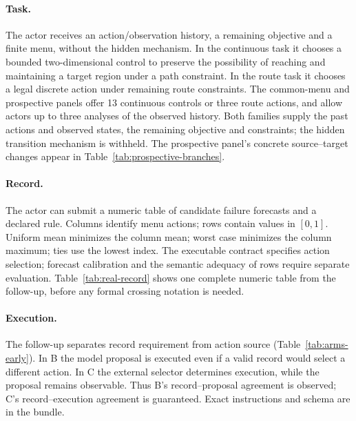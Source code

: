 \paragraph{Task.}
The actor receives an action/observation history, a remaining objective and a
finite menu, without the hidden mechanism. In the continuous task it chooses
a bounded two-dimensional control to preserve the possibility of reaching
and maintaining a target region under a path constraint. In the route task
it chooses a legal discrete action under remaining route constraints.
The common-menu and prospective panels offer 13 continuous controls or
three route actions, and allow actors up to three analyses of the observed
history. Both families supply the past actions and observed states, the
remaining objective and constraints; the hidden transition mechanism is
withheld. The prospective panel's concrete source--target changes appear in
Table~\ref{tab:prospective-branches}.

\paragraph{Record.}
The actor can submit a numeric table of candidate failure forecasts and a
declared rule. Columns identify menu actions; rows contain values in $[0,1]$.
Uniform mean minimizes the column mean; worst case minimizes the column
maximum; ties use the lowest index. The executable contract specifies action selection; forecast calibration
and the semantic adequacy of rows require separate evaluation.
Table~\ref{tab:real-record} shows one complete numeric table from the follow-up,
before any formal crossing notation is needed.



\paragraph{Execution.}
The follow-up separates record requirement from action source
(Table~\ref{tab:arms-early}). In B the model proposal is executed even if a
valid record would select a different action. In C the external selector
determines execution, while the proposal remains observable. Thus B's
record--proposal agreement is observed; C's record--execution agreement is
guaranteed. Exact instructions and schema are in the bundle.

